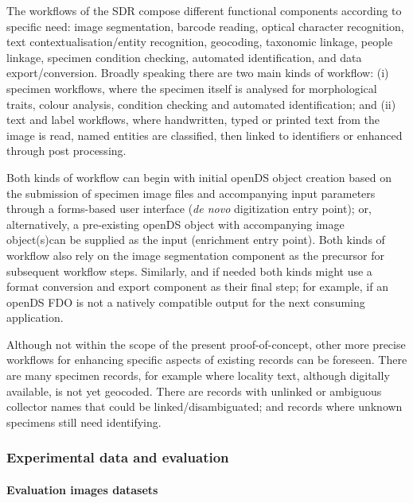The workflows of the SDR compose different functional components
according to specific need: image segmentation, barcode reading, optical
character recognition, text contextualisation/entity recognition,
geocoding, taxonomic linkage, people linkage, specimen condition
checking, automated identification, and data export/conversion. Broadly
speaking there are two main kinds of workflow: (i) specimen workflows,
where the specimen itself is analysed for morphological traits, colour
analysis, condition checking and automated identification; and (ii) text
and label workflows, where handwritten, typed or printed text from the
image is read, named entities are classified, then linked to identifiers
or enhanced through post processing.

Both kinds of workflow can begin with initial openDS object creation
based on the submission of specimen image files and accompanying input
parameters through a forms-based user interface (\emph{de novo}
digitization entry point); or, alternatively, a pre-existing openDS
object with accompanying image object(s)can be supplied as the input
(enrichment entry point). Both kinds of workflow also rely on the image
segmentation component as the precursor for subsequent workflow steps.
Similarly, and if needed both kinds might use a format conversion and
export component as their final step; for example, if an openDS FDO is
not a natively compatible output for the next consuming application.

Although not within the scope of the present proof-of-concept, other
more precise workflows for enhancing specific aspects of existing
records can be foreseen. There are many specimen records, for example
where locality text, although digitally available, is not yet geocoded.
There are records with unlinked or ambiguous collector names that could
be linked/disambiguated; and records where unknown specimens still need
identifying.

\hypertarget{experimental-data-and-evaluation}{%
\subsubsection{Experimental data and
evaluation}\label{experimental-data-and-evaluation}}

\hypertarget{evaluation-images-datasets}{%
\paragraph{Evaluation images
datasets}\label{evaluation-images-datasets}}

